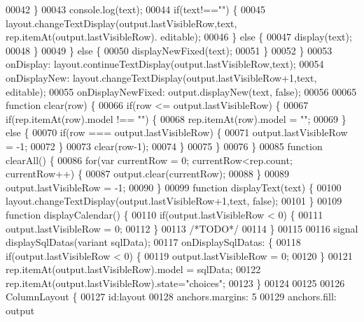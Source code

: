 \begin{DoxyCode}
00042             \}
00043             console.log(text);
00044             \textcolor{keywordflow}{if}(text!==\textcolor{stringliteral}{""}) \{
00045                 layout.changeTextDisplay(output.lastVisibleRow,text, rep.itemAt(output.lastVisibleRow).
      editable);
00046             \} \textcolor{keywordflow}{else} \{
00047                 display(text);
00048             \}
00049         \} \textcolor{keywordflow}{else} \{
00050             displayNewFixed(text);
00051         \}
00052     \}
00053     onDisplay: layout.continueTextDisplay(output.lastVisibleRow,text);
00054     onDisplayNew: layout.changeTextDisplay(output.lastVisibleRow+1,text, editable);
00055     onDisplayNewFixed: output.displayNew(text, \textcolor{keyword}{false});
00056 
00065     \textcolor{keyword}{function} clear(row) \{
00066         \textcolor{keywordflow}{if}(row <= output.lastVisibleRow) \{
00067             \textcolor{keywordflow}{if}(rep.itemAt(row).model !== \textcolor{stringliteral}{""}) \{
00068                 rep.itemAt(row).model = \textcolor{stringliteral}{""};
00069             \} \textcolor{keywordflow}{else} \{
00070                 \textcolor{keywordflow}{if}(row === output.lastVisibleRow) \{
00071                     output.lastVisibleRow = -1;
00072                 \}
00073                 clear(row-1);
00074             \}
00075         \}
00076     \}
00085     \textcolor{keyword}{function} clearAll() \{
00086         \textcolor{keywordflow}{for}(var currentRow = 0; currentRow<rep.count; currentRow++) \{
00087             output.clear(currentRow);
00088         \}
00089         output.lastVisibleRow = -1;
00090     \}
00099     \textcolor{keyword}{function} displayText(text) \{
00100         layout.changeTextDisplay(output.lastVisibleRow+1,text, \textcolor{keyword}{false});
00101     \}
00109     \textcolor{keyword}{function} displayCalendar() \{
00110         \textcolor{keywordflow}{if}(output.lastVisibleRow < 0) \{
00111             output.lastVisibleRow = 0;
00112         \}
00113         \textcolor{comment}{/*TODO*/}
00114     \}
00115 
00116     signal displaySqlDatas(variant sqlData);
00117     onDisplaySqlDatas: \{
00118         \textcolor{keywordflow}{if}(output.lastVisibleRow < 0) \{
00119             output.lastVisibleRow = 0;
00120         \}
00121         rep.itemAt(output.lastVisibleRow).model = sqlData;
00122         rep.itemAt(output.lastVisibleRow).state=\textcolor{stringliteral}{"choices"};
00123     \}
00124 
00125 
00126     ColumnLayout \{
00127         \textcolor{keywordtype}{id}:layout
00128         anchors.margins: 5
00129         anchors.fill: output

\end{DoxyCode}
